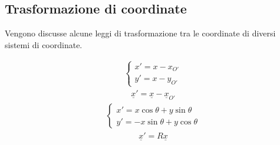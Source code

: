 \documentclass[letterpaper,10pt,english]{jupyterBook}
\begin{document}
\subsection{Trasformazione di coordinate}
\label{\detokenize{ch/analytic_geometry/analytic_geometry_2d/coordinates:trasformazione-di-coordinate}}
\sphinxAtStartPar
Vengono discusse alcune leggi di trasformazione tra le coordinate di diversi sistemi di coordinate.

\sphinxAtStartPar
{}
\begin{equation*}
\begin{split}\begin{cases}
  x' = x - x_{O'} \\
  y' = x - y_{O'}
\end{cases}\end{split}
\end{equation*}\begin{equation*}
\begin{split}\underline{x}' = \underline{x} - \underline{x}_{O'}\end{split}
\end{equation*}
\sphinxAtStartPar
{}
\begin{equation*}
\begin{split}\begin{cases}
  x' = x \cos \theta + y \sin \theta \\
  y' =-x \sin \theta + y \cos \theta
\end{cases}\end{split}
\end{equation*}\begin{equation*}
\begin{split}\underline{x}' = R \underline{x}\end{split}
\end{equation*}
\sphinxAtStartPar
{}
\end{document}
